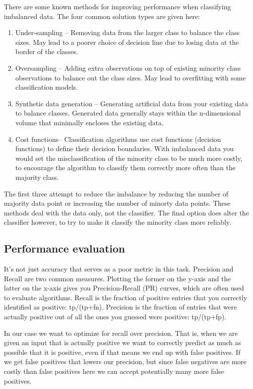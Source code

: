 \documentclass{article}
\begin{document}
There are some known methods for improving performance when classifying imbalanced data. The four common solution types are given here:
\begin{enumerate}
\item Under-sampling -- Removing data from the larger class to balance the class sizes.
May lead to a poorer choice of decision line due to losing data at the border of the classes.
\item Oversampling -- Adding extra observations on top of existing minority class observations to balance out the class sizes.
May lead to overfitting with some classification models.
\item Synthetic data generation -- Generating artificial data from your existing data to balance classes.
Generated data generally stays within the n-dimensional volume that minimally encloses the existing data.
\item Cost functions-- Classification algorithms use cost functions (decision functions) to define their decision boundaries.
With imbalanced data you would set the misclassification of the minority class to be much more costly, to encourage the algorithm to classify them correctly more often than the majority class.
\end{enumerate}
The first three attempt to reduce the imbalance by reducing the number of majority data point or increasing the number of minorty data points.
These methods deal with the data only, not the classifier.
The final option does alter the classifier however, to try to make it classify the minority class more reliably.

\subsection{Performance evaluation}

It's not just accuracy that serves as a poor metric in this task.
Precision and Recall are two common measures.
Plotting the former on the y-axis and the latter on the x-axis gives you Precision-Recall (PR) curves, which are often used to evaluate algorithms.
Recall is the fraction of positive entries that you correctly identified as positive: tp/(tp+fn).
Precision is the fraction of entries that were actually positive out of all the ones you guessed were positive: tp/(tp+fp).

In our case we want to optimize for recall over precision.
That is, when we are given an input that is actually positive we want to correctly predict as much as possible that it is positive, even if that means we end up with false positives.
If we get false positives that lowers our precision, but since false negatives are more costly than false positives here we can accept potentially many more false positives.
\end{document}
